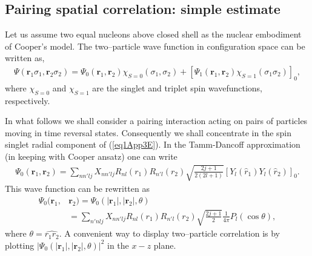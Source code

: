 \begin{subappendices}
 
\section{Pairing spatial correlation: simple estimate}\label{app3D}
Let us assume two equal nucleons above closed shell as the nuclear embodiment of Cooper's model. The two--particle wave function in configuration space can be written as,
\begin{align}\label{eq1App3E}
\Psi(\mathbf r_1\sigma_1,\mathbf r_2\sigma_2)=\Psi_0(\mathbf r_1,\mathbf r_2)\chi_{S=0}(\sigma_1,\sigma_2)+\left[\Psi_1(\mathbf r_1,\mathbf r_2)\chi_{S=1}(\sigma_1\sigma_2)\right]_0,
\end{align}
where $\chi_{S=0}$ and $\chi_{S=1}$ are the singlet and triplet spin wavefunctions, respectively.

In what follows we shall consider a pairing interaction acting on pairs of particles moving in time reversal states. Consequently we shall concentrate in the spin singlet radial component of (\ref{eq1App3E}). In the Tamm-Dancoff approximation (in keeping with Cooper ansatz) one can write
\begin{align}\label{eq2App3E}
\Psi_0(\mathbf r_1,\mathbf r_2)=\sum_{nn'lj}X_{nn'lj}R_{nl}(r_1)R_{n'l}(r_2)\sqrt{\frac{2j+1}{2(2l+1)}}\left[Y_l(\hat r_1)Y_l(\hat r_2)\right]_0.
\end{align}
This wave function can be rewritten as
\begin{align}\label{eq3App3Ex}
\nonumber\Psi_0(\mathbf r_1,&\mathbf r_2)=\Psi_0(|\mathbf r_1|,|\mathbf r_2|,\theta)\\
&=\sum_{n'nlj}X_{nn'lj}R_{nl}(r_1)R_{n'l}(r_2)\sqrt{\frac{2j+1}{2}}\frac{1}{4\pi}P_l(\cos\theta),
\end{align}
where $\theta=\widehat{r_1r_2}$. A convenient way to display two--particle correlation is by plotting $|\Psi_0(|\mathbf r_1|,|\mathbf r_2|,\theta)|^2$ in the $x-z$ plane.



\end{subappendices}

